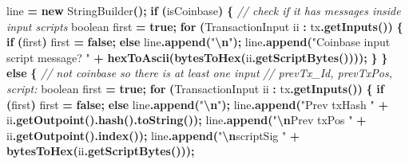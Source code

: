 \documentclass[
  italian,
  openany]{book}
\newenvironment{Shaded}{\begin{snugshade}}{\end{snugshade}}
\newcommand{\BuiltInTok}[1]{#1}
\newcommand{\CommentTok}[1]{\textcolor[rgb]{0.56,0.35,0.01}{\textit{#1}}}
\newcommand{\ControlFlowTok}[1]{\textcolor[rgb]{0.13,0.29,0.53}{\textbf{#1}}}
\newcommand{\DataTypeTok}[1]{\textcolor[rgb]{0.13,0.29,0.53}{#1}}
\newcommand{\FunctionTok}[1]{\textcolor[rgb]{0.13,0.29,0.53}{\textbf{#1}}}
\newcommand{\KeywordTok}[1]{\textcolor[rgb]{0.13,0.29,0.53}{\textbf{#1}}}
\newcommand{\NormalTok}[1]{#1}
\newcommand{\OperatorTok}[1]{\textcolor[rgb]{0.81,0.36,0.00}{\textbf{#1}}}
\newcommand{\SpecialCharTok}[1]{\textcolor[rgb]{0.81,0.36,0.00}{\textbf{#1}}}
\newcommand{\StringTok}[1]{\textcolor[rgb]{0.31,0.60,0.02}{#1}}
\begin{document}
\begin{Shaded}
\begin{Highlighting}[]
\NormalTok{    line }\OperatorTok{=} \KeywordTok{new} \BuiltInTok{StringBuilder}\OperatorTok{();}
    \ControlFlowTok{if} \OperatorTok{(}\NormalTok{isCoinbase}\OperatorTok{)} \OperatorTok{\{}
        \CommentTok{// check if it has messages inside input scripts}
        \DataTypeTok{boolean}\NormalTok{ first }\OperatorTok{=} \KeywordTok{true}\OperatorTok{;}
        \ControlFlowTok{for} \OperatorTok{(}\NormalTok{TransactionInput ii }\OperatorTok{:}\NormalTok{ tx}\OperatorTok{.}\FunctionTok{getInputs}\OperatorTok{())} \OperatorTok{\{}
            \ControlFlowTok{if} \OperatorTok{(}\NormalTok{first}\OperatorTok{)}\NormalTok{ first }\OperatorTok{=} \KeywordTok{false}\OperatorTok{;}
            \ControlFlowTok{else}\NormalTok{ line}\OperatorTok{.}\FunctionTok{append}\OperatorTok{(}\StringTok{"}\SpecialCharTok{\textbackslash{}n}\StringTok{"}\OperatorTok{);}
\NormalTok{            line}\OperatorTok{.}\FunctionTok{append}\OperatorTok{(}\StringTok{"Coinbase input script message? "} \OperatorTok{+}
                \FunctionTok{hexToAscii}\OperatorTok{(}\FunctionTok{bytesToHex}\OperatorTok{(}\NormalTok{ii}\OperatorTok{.}\FunctionTok{getScriptBytes}\OperatorTok{())));}
        \OperatorTok{\}}
    \OperatorTok{\}} \ControlFlowTok{else} \OperatorTok{\{}
        \CommentTok{// not coinbase so there is at least one input}
        \CommentTok{// prevTx\_Id, prevTxPos, script:}
        \DataTypeTok{boolean}\NormalTok{ first }\OperatorTok{=} \KeywordTok{true}\OperatorTok{;}
        \ControlFlowTok{for} \OperatorTok{(}\NormalTok{TransactionInput ii }\OperatorTok{:}\NormalTok{ tx}\OperatorTok{.}\FunctionTok{getInputs}\OperatorTok{())} \OperatorTok{\{}
            \ControlFlowTok{if} \OperatorTok{(}\NormalTok{first}\OperatorTok{)}\NormalTok{ first }\OperatorTok{=} \KeywordTok{false}\OperatorTok{;}
            \ControlFlowTok{else}\NormalTok{ line}\OperatorTok{.}\FunctionTok{append}\OperatorTok{(}\StringTok{"}\SpecialCharTok{\textbackslash{}n}\StringTok{"}\OperatorTok{);}
\NormalTok{            line}\OperatorTok{.}\FunctionTok{append}\OperatorTok{(}\StringTok{"Prev txHash "} \OperatorTok{+}\NormalTok{ ii}\OperatorTok{.}\FunctionTok{getOutpoint}\OperatorTok{().}\FunctionTok{hash}\OperatorTok{().}\FunctionTok{toString}\OperatorTok{());}
\NormalTok{            line}\OperatorTok{.}\FunctionTok{append}\OperatorTok{(}\StringTok{"}\SpecialCharTok{\textbackslash{}n}\StringTok{Prev txPos  "} \OperatorTok{+}\NormalTok{ ii}\OperatorTok{.}\FunctionTok{getOutpoint}\OperatorTok{().}\FunctionTok{index}\OperatorTok{());}
\NormalTok{            line}\OperatorTok{.}\FunctionTok{append}\OperatorTok{(}\StringTok{"}\SpecialCharTok{\textbackslash{}n}\StringTok{scriptSig   "} \OperatorTok{+} \FunctionTok{bytesToHex}\OperatorTok{(}\NormalTok{ii}\OperatorTok{.}\FunctionTok{getScriptBytes}\OperatorTok{()));}

\end{Highlighting}
\end{Shaded}
\end{document}
